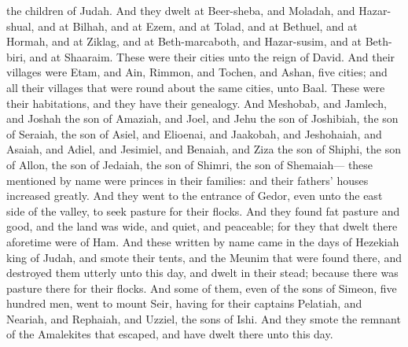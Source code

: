 the children of Judah. And they dwelt at Beer-sheba, and Moladah, and Hazar-shual, and at Bilhah, and at Ezem, and at Tolad, and at Bethuel, and at Hormah, and at Ziklag, and at Beth-marcaboth, and Hazar-susim, and at Beth-biri, and at Shaaraim. These were their cities unto the reign of David. And their villages were Etam, and Ain, Rimmon, and Tochen, and Ashan, five cities; and all their villages that were round about the same cities, unto Baal. These were their habitations, and they have their genealogy. And Meshobab, and Jamlech, and Joshah the son of Amaziah, and Joel, and Jehu the son of Joshibiah, the son of Seraiah, the son of Asiel, and Elioenai, and Jaakobah, and Jeshohaiah, and Asaiah, and Adiel, and Jesimiel, and Benaiah, and Ziza the son of Shiphi, the son of Allon, the son of Jedaiah, the son of Shimri, the son of Shemaiah— these mentioned by name were princes in their families: and their fathers’ houses increased greatly. And they went to the entrance of Gedor, even unto the east side of the valley, to seek pasture for their flocks. And they found fat pasture and good, and the land was wide, and quiet, and peaceable; for they that dwelt there aforetime were of Ham. And these written by name came in the days of Hezekiah king of Judah, and smote their tents, and the Meunim that were found there, and destroyed them utterly unto this day, and dwelt in their stead; because there was pasture there for their flocks. And some of them, even of the sons of Simeon, five hundred men, went to mount Seir, having for their captains Pelatiah, and Neariah, and Rephaiah, and Uzziel, the sons of Ishi. And they smote the remnant of the Amalekites that escaped, and have dwelt there unto this day. 

